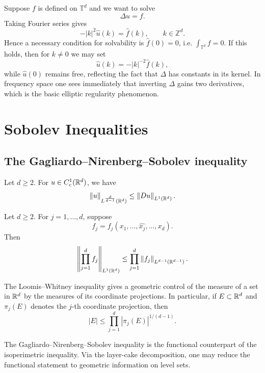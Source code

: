\begin{remark}
Suppose $f$ is defined on $\mathbb{T}^d$ and we want to solve
\[
\Delta u = f.
\]
Taking Fourier series gives
\[
-|k|^2\hat u(k)=\hat f(k),\qquad k\in \mathbb{Z}^d.
\]
Hence a necessary condition for solvability is $\hat f(0)=0$, i.e. $\int_{\mathbb{T}^d}f=0$. If this holds, then for $k\neq 0$ we may set
\[
\hat u(k) = -|k|^{-2}\hat f(k),
\]
while $\hat u(0)$ remains free, reflecting the fact that $\Delta$ has constants in its kernel. In frequency space one sees immediately that inverting $\Delta$ gains two derivatives, which is the basic elliptic regularity phenomenon.
\end{remark}


\section{Sobolev Inequalities}

\subsection{The Gagliardo--Nirenberg--Sobolev inequality}

\begin{theorem}
Let $d \ge 2$. For $u \in C_c^1(\mathbb{R}^d)$, we have
\[
\left\lVert u \right\rVert_{L^{\frac{d}{d-1}}(\mathbb{R}^d)} \le \left\lVert Du \right\rVert_{L^1(\mathbb{R}^d)}.
\]
\end{theorem}

\begin{lemma}
Let $d \ge 2$. For $j=1,\dots,d$, suppose
\[
f_j=f_j(x_1,\dots,\widehat{x_j},\dots,x_d).
\]
Then
\[
\left\| \prod_{j=1}^d f_j \right\|_{L^1(\mathbb{R}^d)}
\le
\prod_{j=1}^d \left\lVert f_j \right\rVert_{L^{d-1}(\mathbb{R}^{d-1})}.
\]
\end{lemma}

\begin{remark}
The Loomis--Whitney inequality gives a geometric control of the measure of a set in $\mathbb{R}^d$ by the measures of its coordinate projections. In particular, if $E\subset \mathbb{R}^d$ and $\pi_j(E)$ denotes the $j$-th coordinate projection, then
\[
|E| \le \prod_{j=1}^d |\pi_j(E)|^{1/(d-1)}.
\]
\end{remark}

\begin{remark}
The Gagliardo--Nirenberg--Sobolev inequality is the functional counterpart of the isoperimetric inequality. Via the layer-cake decomposition, one may reduce the functional statement to geometric information on level sets.
\end{remark}

